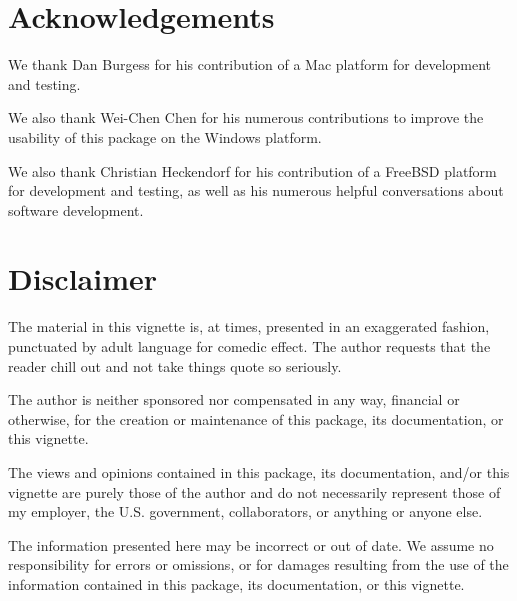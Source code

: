\section*{Acknowledgements}

We thank Dan Burgess for his contribution of a Mac platform for development and testing.

We also thank Wei-Chen Chen for his numerous contributions to improve the usability of this package on the Windows 
platform.  

We also thank Christian Heckendorf for his contribution of a FreeBSD platform for development and testing, as well as his numerous helpful conversations about software development.


\section*{Disclaimer}

The material in this vignette is, at times, presented in an exaggerated fashion, punctuated by adult language for comedic effect.  The author requests that the reader chill out and not take things quote so seriously.  

The author is neither sponsored nor compensated in any way, financial or otherwise, for the creation or maintenance of this package, its documentation, or this vignette.  

The views and opinions contained in this package, its documentation, and/or this vignette are purely those of the author and do not necessarily represent those of my employer, the U.S. government, collaborators, or anything or anyone else.

The information presented here may be incorrect or out of date.   We assume no responsibility for errors or omissions, or for damages resulting from the use of the information contained in this package, its documentation, or this vignette.
